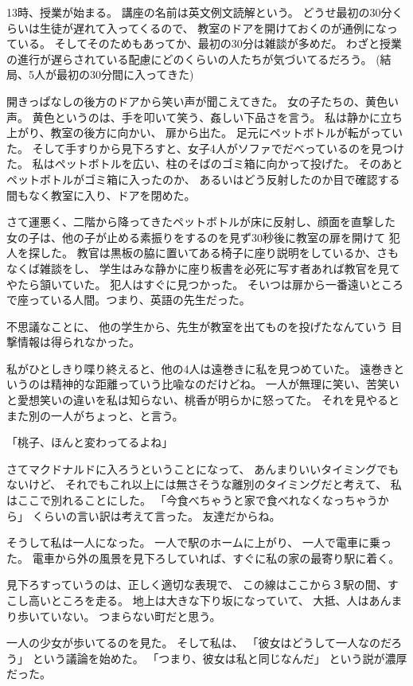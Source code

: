 \documentclass[]{book}
\begin{document}
13時、授業が始まる。 講座の名前は英文例文読解という。
どうせ最初の30分くらいは生徒が遅れて入ってくるので、
教室のドアを開けておくのが通例になっている。
そしてそのためもあってか、最初の30分は雑談が多めだ。
わざと授業の進行が遅らされている配慮にどのくらいの人たちが気づいてるだろう。
(結局、5人が最初の30分間に入ってきた)

開きっぱなしの後方のドアから笑い声が聞こえてきた。
女の子たちの、黄色い声。
黄色というのは、手を叩いて笑う、姦しい下品さを言う。
私は静かに立ち上がり、教室の後方に向かい、 扉から出た。
足元にペットボトルが転がっていた。
そして手すりから見下ろすと、女子4人がソファでだべっているのを見つけた。
私はペットボトルを広い、柱のそばのゴミ箱に向かって投げた。
そのあとペットボトルがゴミ箱に入ったのか、
あるいはどう反射したのか目で確認する間もなく教室に入り、ドアを閉めた。

さて運悪く、二階から降ってきたペットボトルが床に反射し、顔面を直撃した
女の子は、他の子が止める素振りをするのを見ず30秒後に教室の扉を開けて
犯人を探した。
教官は黒板の脇に置いてある椅子に座り説明をしているか、さもなくば雑談をし、
学生はみな静かに座り板書を必死に写す者あれば教官を見てやたら頷いていた。
犯人はすぐに見つかった。
そいつは扉から一番遠いところで座っている人間。つまり、英語の先生だった。

不思議なことに、 他の学生から、先生が教室を出てものを投げたなんていう
目撃情報は得られなかった。

私がひとしきり喋り終えると、他の4人は遠巻きに私を見つめていた。
遠巻きというのは精神的な距離っていう比喩なのだけどね。
一人が無理に笑い、苦笑いと愛想笑いの違いを私は知らない、桃香が明らかに怒ってた。
それを見やるとまた別の一人がちょっと、と言う。

「桃子、ほんと変わってるよね」

さてマクドナルドに入ろうということになって、
あんまりいいタイミングでもないけど、
それでもこれ以上には無さそうな離別のタイミングだと考えて、
私はここで別れることにした。
「今食べちゃうと家で食べれなくなっちゃうから」
くらいの言い訳は考えて言った。 友達だからね。

そうして私は一人になった。 一人で駅のホームに上がり、
一人で電車に乗った。
電車から外の風景を見下ろしていれば、すぐに私の家の最寄り駅に着く。

見下ろすっていうのは、正しく適切な表現で、
この線はここから３駅の間、すこし高いところを走る。
地上は大きな下り坂になっていて、 大抵、人はあんまり歩いていない。
つまらない町だと思う。

一人の少女が歩いてるのを見た。 そして私は、
「彼女はどうして一人なのだろう」 という議論を始めた。
「つまり、彼女は私と同じなんだ」 という説が濃厚だった。
\end{document}
